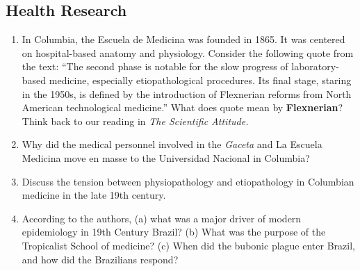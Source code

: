 \documentclass[12pt]{article}
\begin{document}
\subsection{Health Research}

\begin{enumerate}
\item In Columbia, the Escuela de Medicina was founded in 1865.  It was centered on hospital-based anatomy and physiology. Consider the following quote from the text: ``The second phase is notable for the slow progress of laboratory-based medicine, especially etiopathological procedures.  Its final stage, staring in the 1950s, is defined by the introduction of Flexnerian reforms from North American technological medicine.''  What does quote mean by \textbf{Flexnerian}?  Think back to our reading in \textit{The Scientific Attitude.} \\ \vspace{1.5cm}
\item Why did the medical personnel involved in the \textit{Gaceta} and La Escuela Medicina move en masse to the Universidad Nacional in Columbia? \\ \vspace{1.5cm}
\item Discuss the tension between physiopathology and etiopathology in Columbian medicine in the late 19th century.  \\ \vspace{1cm}
\item According to the authors, (a) what was a major driver of modern epidemiology in 19th Century Brazil? (b) What was the purpose of the Tropicalist School of medicine? (c) When did the bubonic plague enter Brazil, and how did the Brazilians respond? \\ \vspace{1.5cm}
\end{enumerate}
\end{document}
